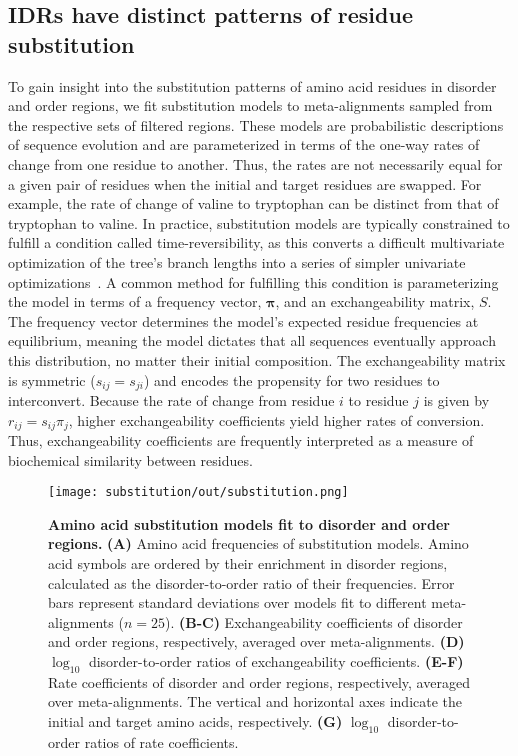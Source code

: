 \subsection{IDRs have distinct patterns of residue substitution}
To gain insight into the substitution patterns of amino acid residues in disorder and order regions, we fit substitution models to meta-alignments sampled from the respective sets of filtered regions. These models are probabilistic descriptions of sequence evolution and are parameterized in terms of the one-way rates of change from one residue to another. Thus, the rates are not necessarily equal for a given pair of residues when the initial and target residues are swapped. For example, the rate of change of valine to tryptophan can be distinct from that of tryptophan to valine. In practice, substitution models are typically constrained to fulfill a condition called time-reversibility, as this converts a difficult multivariate optimization of the tree's branch lengths into a series of simpler univariate optimizations~\cite{Felsenstein1981}. A common method for fulfilling this condition is parameterizing the model in terms of a frequency vector, $\boldsymbol \pi$, and an exchangeability matrix, $S$. The frequency vector determines the model's expected residue frequencies at equilibrium, meaning the model dictates that all sequences eventually approach this distribution, no matter their initial composition. The exchangeability matrix is symmetric ($s_{ij} = s_{ji}$) and encodes the propensity for two residues to interconvert. Because the rate of change from residue $i$ to residue $j$ is given by $r_{ij} = s_{ij}\pi_{j}$, higher exchangeability coefficients yield higher rates of conversion. Thus, exchangeability coefficients are frequently interpreted as a measure of biochemical similarity between residues.

\begin{figure}[h!]
\texttt{[image: substitution/out/substitution.png]}
\centering
\caption{\textbf{Amino acid substitution models fit to disorder and order regions.}
\textbf{(A)} Amino acid frequencies of substitution models. Amino acid symbols are ordered by their enrichment in disorder regions, calculated as the disorder-to-order ratio of their frequencies. Error bars represent standard deviations over models fit to different meta-alignments ($n = 25$). \textbf{(B-C)} Exchangeability coefficients of disorder and order regions, respectively, averaged over meta-alignments. \textbf{(D)} $\log_{10}$ disorder-to-order ratios of exchangeability coefficients. \textbf{(E-F)} Rate coefficients of disorder and order regions, respectively, averaged over meta-alignments. The vertical and horizontal axes indicate the initial and target amino acids, respectively. \textbf{(G)} $\log_{10}$ disorder-to-order ratios of rate coefficients.}
\label{fig:substitution}
\end{figure}

